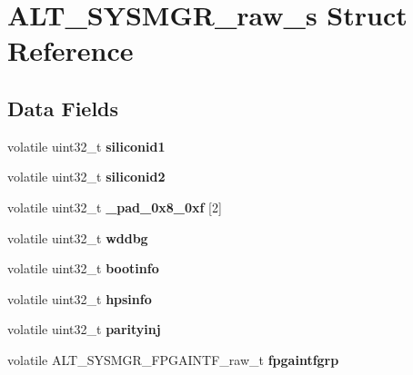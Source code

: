 \hypertarget{structALT__SYSMGR__raw__s}{}\section{A\+L\+T\+\_\+\+S\+Y\+S\+M\+G\+R\+\_\+raw\+\_\+s Struct Reference}
\label{structALT__SYSMGR__raw__s}
\subsection*{Data Fields}
\begin{DoxyCompactItemize}
\item 
\mbox{\label{structALT__SYSMGR__raw__s_a306a3f1f172e0a690fe093392e703325}} 
volatile uint32\+\_\+t {\bfseries siliconid1}
\item 
\mbox{\label{structALT__SYSMGR__raw__s_adbda8f774ecb87b770edfe8a3dac3b51}} 
volatile uint32\+\_\+t {\bfseries siliconid2}
\item 
\mbox{\label{structALT__SYSMGR__raw__s_ac24e5212b4790aad71206984c2908cd9}} 
volatile uint32\+\_\+t {\bfseries \+\_\+pad\+\_\+0x8\+\_\+0xf} \mbox{[}2\mbox{]}
\item 
\mbox{\label{structALT__SYSMGR__raw__s_aca5a49c280d64e16861dd3b612bb0167}} 
volatile uint32\+\_\+t {\bfseries wddbg}
\item 
\mbox{\label{structALT__SYSMGR__raw__s_a88af848b07a891589947dc6b6c480f69}} 
volatile uint32\+\_\+t {\bfseries bootinfo}
\item 
\mbox{\label{structALT__SYSMGR__raw__s_a50a4f42a9b5e8a7bea3fa7b58e5fa7c2}} 
volatile uint32\+\_\+t {\bfseries hpsinfo}
\item 
\mbox{\label{structALT__SYSMGR__raw__s_a67d9d06d92991fe704a889bec30fffee}} 
volatile uint32\+\_\+t {\bfseries parityinj}
\item 
\mbox{\label{structALT__SYSMGR__raw__s_af6a76b4871311d6c82c769dcc7e5c84f}} 
volatile A\+L\+T\+\_\+\+S\+Y\+S\+M\+G\+R\+\_\+\+F\+P\+G\+A\+I\+N\+T\+F\+\_\+raw\+\_\+t {\bfseries fpgaintfgrp}

\end{DoxyCompactItemize}
